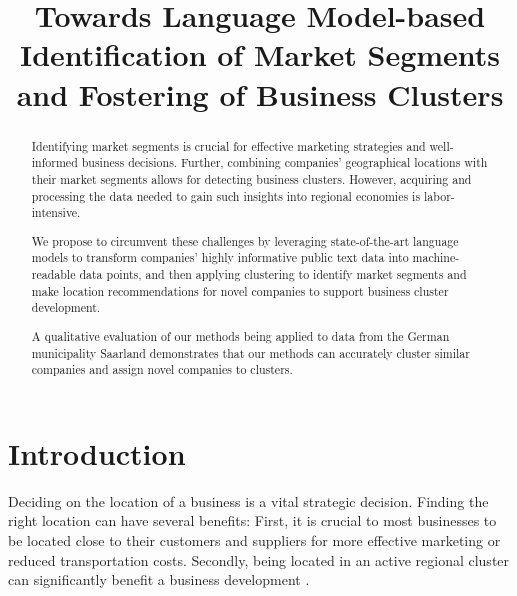 \documentclass[conference]{IEEEtran}
\begin{document}
\title{Towards Language Model-based Identification of Market Segments and Fostering of Business Clusters}

\author{
\and
{}
\and
{}
\and
{}
\and
{}
}

\maketitle

\begin{abstract}
Identifying market segments is crucial for effective marketing strategies and well-informed business decisions. Further, combining companies' geographical locations with their market segments allows for detecting business clusters. However, acquiring and processing the data needed to gain such insights into regional economies is labor-intensive. 

We propose to circumvent these challenges by leveraging state-of-the-art language models to transform companies' highly informative public text data into machine-readable data points, and then applying clustering to identify market segments and make location recommendations for novel companies to support business cluster development. 

A qualitative evaluation of our methods being applied to data from the German municipality Saarland demonstrates that our methods can accurately cluster similar companies and assign novel companies to clusters.
\end{abstract}


\section{Introduction}

Deciding on the location of a business is a vital strategic decision. Finding the right location can have several benefits: First, it is crucial to most businesses to be located close to their customers and suppliers for more effective marketing or reduced transportation costs. Secondly, being located in an active regional cluster can significantly benefit a business development \cite{clustersandcomp,gems-model, regionaladv, clustertheory}. 
\end{document}
